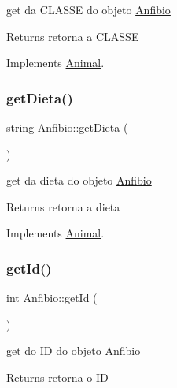 get da C\+L\+A\+S\+SE do objeto \mbox{\hyperlink{class_anfibio}{Anfibio}} 

\begin{DoxyReturn}{Returns}
retorna a C\+L\+A\+S\+SE 
\end{DoxyReturn}


Implements \mbox{\hyperlink{class_animal}{Animal}}.

\mbox{\label{class_anfibio_a6e40c90ce1434b51619f5efba96cb7d7}} 
\subsubsection{\texorpdfstring{getDieta()}{getDieta()}}
{\footnotesize\ttfamily string Anfibio\+::get\+Dieta (\begin{DoxyParamCaption}{ }\end{DoxyParamCaption})\hspace{0.3cm}{\ttfamily [virtual]}}



get da dieta do objeto \mbox{\hyperlink{class_anfibio}{Anfibio}} 

\begin{DoxyReturn}{Returns}
retorna a dieta 
\end{DoxyReturn}


Implements \mbox{\hyperlink{class_animal}{Animal}}.

\mbox{\label{class_anfibio_a1bcae8c79bb6e88d7d8a808a0a16e2d5}} 
\subsubsection{\texorpdfstring{getId()}{getId()}}
{\footnotesize\ttfamily int Anfibio\+::get\+Id (\begin{DoxyParamCaption}{ }\end{DoxyParamCaption})\hspace{0.3cm}{\ttfamily [virtual]}}



get do ID do objeto \mbox{\hyperlink{class_anfibio}{Anfibio}} 

\begin{DoxyReturn}{Returns}
retorna o ID 
\end{DoxyReturn}



